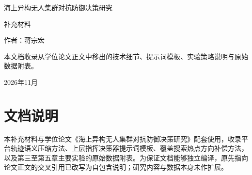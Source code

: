 \documentclass[UTF8,oneside,12pt]{ctexbook}
\begin{document}
\begin{titlepage}
  \centering
  \vspace*{3.0cm}
  {\heiti{} 海上异构无人集群对抗防御决策研究\par}
  \vspace{1.2cm}
  {\heiti{} 补充材料\par}
  \vspace{2.5cm}
  { 作者：蒋宗宏\par}
  \vfill
  { 本文档收录从学位论文正文中移出的技术细节、提示词模板、实验策略说明与原始数据附表。\par}
  \vspace{0.8cm}
  { 2026年11月\par}
\end{titlepage}

\frontmatter
\chapter*{文档说明}
本补充材料与学位论文《海上异构无人集群对抗防御决策研究》配套使用，收录平台轨迹语义压缩方法、上层指挥决策器提示词模板、覆盖搜索热点方向补偿方法，以及第三至第五章主要实验的原始数据附表。为保证文档能够独立编译，原先指向论文正文的交叉引用已改写为自包含说明；研究内容与数据本身未作扩展。

\tableofcontents

\mainmatter
\appendix

\end{document}
